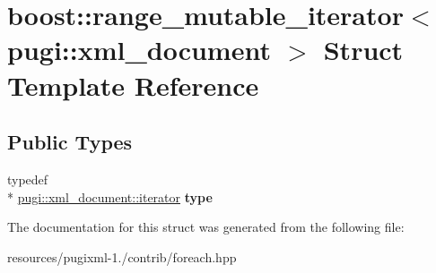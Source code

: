 \hypertarget{structboost_1_1range__mutable__iterator_3_01pugi_1_1xml__document_01_4}{\section{boost\+:\+:range\+\_\+mutable\+\_\+iterator$<$ pugi\+:\+:xml\+\_\+document $>$ Struct Template Reference}
\label{structboost_1_1range__mutable__iterator_3_01pugi_1_1xml__document_01_4}
}
\subsection*{Public Types}
\begin{DoxyCompactItemize}
\item 
\hypertarget{structboost_1_1range__mutable__iterator_3_01pugi_1_1xml__document_01_4_a8523f9f4c77e5ebba00a1ae90c1d0841}{typedef \\*
\hyperlink{classpugi_1_1xml__node__iterator}{pugi\+::xml\+\_\+document\+::iterator} {\bfseries type}}\label{structboost_1_1range__mutable__iterator_3_01pugi_1_1xml__document_01_4_a8523f9f4c77e5ebba00a1ae90c1d0841}

\end{DoxyCompactItemize}


The documentation for this struct was generated from the following file\+:\begin{DoxyCompactItemize}
\item 
resources/pugixml-\/1./contrib/foreach.\+hpp\end{DoxyCompactItemize}
